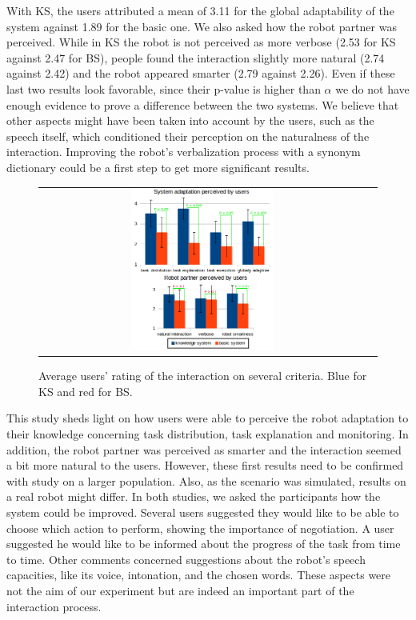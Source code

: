 With KS, the users attributed a mean of 3.11 for the global adaptability of the system against 1.89 for the basic one.
We also asked how the robot partner was perceived. While in KS the robot is not perceived as more verbose (2.53 for KS against 2.47 for BS), people found the interaction slightly more natural (2.74 against 2.42) and the robot appeared smarter (2.79 against 2.26). Even if these last two results look favorable, since their p-value is higher than $\alpha$  we do not have enough evidence to prove a difference between the two systems. We believe that other aspects might have been taken into account by the users, such as the speech itself, which conditioned their perception on the naturalness of the interaction. Improving the robot's verbalization process with a synonym dictionary could be a first step to get more significant results.



 \begin{figure}[ht!]
 \centering
 \begin{tabular}{cc}
  \includegraphics[width=0.45\textwidth]{img/teacher/respvalue3.png}
 \end{tabular}
 \caption[Average users' rating of the interaction on several criteria]{Average users' rating of the interaction on several criteria. Blue for KS and red for BS.}
 \label{fig:teacher_results-results}
 \end{figure}

This study sheds light on how users were able to perceive the robot adaptation to their knowledge concerning task distribution, task explanation and monitoring. In addition, the robot partner was perceived as smarter and the interaction seemed a bit more natural to the users. However, these first results need to be confirmed with study on a larger population. Also, as the scenario was simulated, results on a real robot might differ.
In both studies, we asked the participants how the system could be improved. Several users suggested they would like to be able to choose which action to perform, showing the importance of negotiation. A user suggested he would like to be informed about the progress of the task from time to time. Other comments concerned suggestions about the robot's speech capacities, like its voice, intonation, and the chosen words. These aspects were not the aim of our  experiment but are indeed an important part of the interaction process. 

